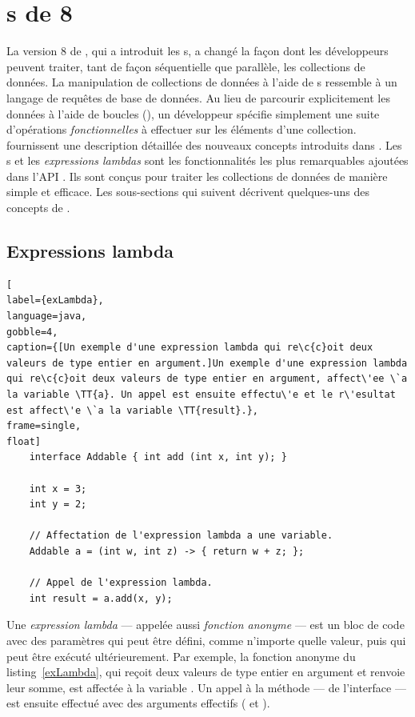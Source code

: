 \section{s de  8}
\label{java8.sect}

La version 8 de , qui a introduit les s, a chang\'e la façon dont les d\'eveloppeurs peuvent traiter, tant de fa\c{c}on s\'equentielle que parall\`ele, les collections de donn\'ees. La manipulation de collections de donn\'ees \`a l'aide de s ressemble \`a un langage de requ\^etes de base de donn\'ees. Au lieu de parcourir explicitement les donn\'ees \`a l'aide de boucles (), un d\'eveloppeur sp\'ecifie simplement une suite d'op\'erations \emph{fonctionnelles} \`a effectuer sur les \'el\'ements d'une collection. \cite{urma2014java} fournissent une description d\'etaill\'ee des nouveaux concepts introduits dans . Les s et les \emph{expressions lambdas} sont les fonctionnalit\'es les plus remarquables ajout\'ees dans l'API \citep{javaStreamAPI}. Ils sont con\c{c}us pour traiter les collections de donn\'ees de mani\`ere simple et efficace. Les sous-sections qui suivent d\'ecrivent quelques-uns des concepts de .


\subsection{Expressions lambda}



\begin{lstlisting}[
label={exLambda},
language=java,
gobble=4,
caption={[Un exemple d'une expression lambda qui re\c{c}oit deux valeurs de type entier en argument.]Un exemple d'une expression lambda qui re\c{c}oit deux valeurs de type entier en argument, affect\'ee \`a la variable \TT{a}. Un appel est ensuite effectu\'e et le r\'esultat est affect\'e \`a la variable \TT{result}.},
frame=single,
float]
    interface Addable { int add (int x, int y); }
    
    int x = 3;
    int y = 2;
    
    // Affectation de l'expression lambda a une variable.
    Addable a = (int w, int z) -> { return w + z; };

    // Appel de l'expression lambda.
    int result = a.add(x, y);    
\end{lstlisting}



Une \emph{expression lambda} ---  appel\'ee aussi \emph{fonction anonyme} --- est un bloc de code avec des param\`etres qui peut \^etre d\'efini, comme n'importe quelle valeur, puis qui peut \^etre ex\'ecut\'e ult\'erieurement. Par exemple, la fonction anonyme du listing~\ref{exLambda}, qui re\c{c}oit deux valeurs de type entier en argument et renvoie leur somme, est affect\'ee \`a la variable . Un appel \`a la m\'ethode  --- de l'interface  --- est ensuite effectu\'e avec des arguments effectifs ( et ).


